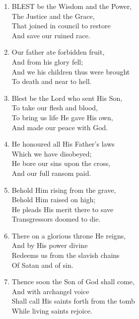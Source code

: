 \documentclass[11pt,a4paper]{article}
\begin{document}
\begin{enumerate}
    \item BLEST be the Wisdom and the Power, \\
        The Justice and the Grace, \\
        That joined in council to restore \\
        And save our ruined race.

    \item Our father ate forbidden fruit, \\
        And from his glory fell; \\
        And we his children thus were brought \\
        To death and near to hell.

    \item Blest be the Lord who sent His Son, \\
        To take our flesh and blood, \\
        To bring us life He gave His own, \\
        And made our peace with God.

    \item He honoured all His Father's laws \\
        Which we have disobeyed; \\
        He bore our sins upon the cross, \\
        And our full ransom paid.

    \item Behold Him rising from the grave, \\
        Behold Him raised on high; \\
        He pleads His merit there to save \\
        Transgressors doomed to die.

    \item There on a glorious throne He reigns, \\
        And by His power divine \\
        Redeems us from the slavish chains \\
        Of Satan and of sin.

    \item Thence soon the Son of God shall come, \\
        And with archangel voice \\
        Shall call His saints forth from the tomb \\
        While living saints rejoice.

\end{enumerate}
\end{document}
